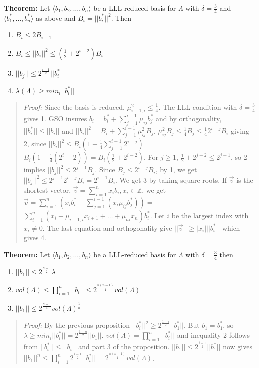 {\bf Theorem: } Let $\langle b_1 , b_2 , \ldots , b_n \rangle$ be a LLL-reduced basis for $\Lambda$
with $\delta = {\frac 3 4}$ and $\langle b_1^* , \ldots , b_n^* \rangle$ as above and $B_i = ||b_i^*||^2$.
Then
\begin{enumerate}
\item $B_i \leq 2 B_{i+1}$
\item $B_i \leq ||b_i||^2 \leq ({\frac 1 2} + 2^{i-2})B_i$
\item $||b_j|| \leq 2^{\frac {i-1} 2} ||b_i^*||$
\item $\lambda(\Lambda) \geq min_i ||b_i^*||$
\end{enumerate}
\begin{quote}
\emph{Proof: }
Since the basis is reduced, $\mu_{i+1,i}^2 \leq {\frac 1 4}$. The LLL condition with $\delta = {\frac 3 4}$
gives 1.  GSO insures $b_i = b_i^* + \sum_{j=1}^{i-1} \mu_{ij}b_j^*$ and by orthogonality,
$||b_i^*|| \leq ||b_i||$ and $||b_i||^2 = B_i + \sum_{j=1}^{i-1} \mu_{ij}^2 B_j$.
$\mu_{ij}^2 B_j \leq {\frac 1 4} B_j \leq {\frac 1 4} 2^{i-j} B_i$ giving 2, since
$||b_i||^2 \leq B_i(1 + {\frac 1 4} \sum_{j=1}^{i-1} 2^{i-j}) = $
$B_i (1+ {\frac 1 4} (2^i - 2))= B_i ({\frac 1 2} + 2^{i-2})$.  For $j \geq 1$, ${\frac 1 2} + 2^{j-2} \leq 2^{j-1}$,
so 2 implies $||b_j||^2 \leq 2^{j-1} B_j$.
Since $B_j \leq 2^{i-j} B_i$, by 1, we get $||b_j||^2 \leq 2^{j-1} 2^{i-j} B_i= 2^{i-1}B_i$.
We get 3 by taking square roots.
If ${\vec v}$ is the shortest vector, ${\vec v} = \sum_{i=1}^n x_i b_i, x_i \in {\mathbb Z}$, we get
${\vec v} = \sum_{i=1}^n (x_i b_i^* + \sum_{j=1}^{i-1} (x_i \mu_{ij} b_j^*))= $
$\sum_{i=1}^n (x_i + \mu_{i+1,i} x_{i+1} + \ldots + \mu_{ni} x_n)b_i^*$.  Let $i$ be the 
largest index with $x_i \ne 0$.  The last equation and orthogonality give $||{\vec v}|| \geq |x_i| ||b_i^*||$ which gives 4.
\end{quote}
{\bf Theorem: } Let $\langle b_1 , b_2 , \ldots , b_n \rangle$ be a LLL-reduced basis for $\Lambda$
with $\delta = {\frac 3 4}$ then
\begin{enumerate}
\item $||b_1|| \leq 2^{\frac {n-1} 2} \lambda$
\item $vol(\Lambda) \leq \prod_{i=1}^n ||b_i|| \leq 2^{\frac {n(n-1)} {4}} vol(\Lambda)$
\item $||b_1|| \leq 2^{\frac {n-1} {4}} vol(\Lambda)^{\frac 1 n}$
\end{enumerate}
\begin{quote}
\emph{Proof: }
By the previous proposition $||b_i^*||^2\geq2^{\frac {1-i} 2} ||b_1^*||$,  But $b_1 = b_1^*$,
so $\lambda \geq min_i ||b_i^*|| = 2^{\frac {1-n} 2} ||b_1||$.  $vol(\Lambda) = \prod_{i=1}^n ||b_i^*||$
and inequality 2 follows from $||b_i^*|| \leq ||b_i||$ and part 3 of the proposition.
$||b_1|| \leq 2^{\frac {i-1} 2} ||b_1^*||$ now gives
$||b_1||^n \leq \prod_{i=1}^n 2^{\frac {i-1} 2} ||b_i^*|| = 2^{\frac {n(n-1)} 4} vol(\Lambda)$.
\end{quote}
